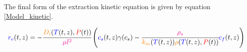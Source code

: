 \documentclass[../Article_Model_Parameters.tex]{subfiles}
\begin{document}
			
	The final form of the extraction kinetic equation is given by equation \ref{Model_kinetic}.
			
	{\footnotesize
		\begin{equation}
			\label{Model_kinetic}
				{\color{blue}r_e}(t,z) = -\cfrac{{\color{orange}D_i}({\color{blue}T}(t,z), {\color{red}P}(t))}{{\color{magenta} \mu l^2} } \left({\color{blue}c_s}(t,z) \gamma(c_s) - \cfrac{{\color{magenta}\rho_s}}{{\color{orange}k_m}({\color{blue}T}(t,z)){\color{orange}\rho}({\color{blue}T}(t,z),{\color{red}P}(t))}  {\color{blue}c_f}(t,z) \right)
		\end{equation} }
			
\end{document}
